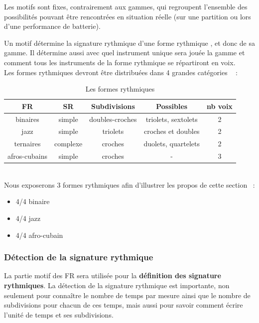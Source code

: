 Les motifs sont fixes, contrairement aux gammes, qui regroupent
l’ensemble des possibilités pouvant être rencontrées en situation réelle
(sur une partition ou lors d’une performance de batterie).

Un motif détermine la signature rythmique d’une
forme rythmique , et donc de sa gamme. Il détermine aussi
avec quel instrument unique sera jouée la gamme et comment tous les
instruments de la forme rythmique se répartiront en voix.\\




Les formes rythmiques devront être distribuées dans 4 grandes
catégories
\cite{system_drums}~ :
\begin{table}[h]
\centering
\begin{tabular}{|c|c|c|c|c|} \hline
FR & SR\footnotemark & Subdivisions & Possibles & nb
voix \\ \hline
binaires & simple & doubles-croches & triolets, sextolets & 2 \\
jazz & simple & triolets & croches et doubles & 2 \\
ternaires & complexe & croches & duolets, quartelets & 2 \\
afros-cubains & simple & croches & - & 3 \\ \hline
\end{tabular}
\caption{Les formes rythmiques}
\end{table}\\
Nous exposerons 3 formes rythmiques afin d’illustrer les propos de
cette section~ :
\begin{itemize}
	\item 4/4 binaire 
	\item 4/4 jazz
	\item 4/4 afro-cubain
\end{itemize}

\subsubsection{Détection de la signature rythmique}
La partie motif des FR sera utilisée pour la
\textbf{définition des signature rythmiques}. 
\label{sign_rythm}
La détection de la signature rythmique est importante, 
non seulement pour connaître le nombre de temps par mesure ainsi que le nombre
de subdivisions pour chacun de ces temps, mais aussi pour savoir comment écrire
l’unité de temps et ses subdivisions.

